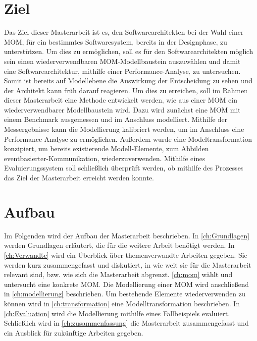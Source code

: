 \section{Ziel}
Das Ziel dieser Masterarbeit ist es, den Softwarearchitekten bei der Wahl einer MOM, für ein bestimmtes  Softwaresystem, bereits in der Designphase, zu unterstützen. Um dies zu ermöglichen, soll es für den Softwarearchitekten möglich sein einen wiederverwendbaren MOM-Modellbaustein auszuwählen und damit eine Softwarearchitektur, mithilfe einer Performance-Analyse, zu untersuchen. Somit ist bereits auf Modellebene die Auswirkung der Entscheidung zu sehen und der Architekt kann früh darauf reagieren. Um dies zu erreichen, soll im Rahmen dieser Masterarbeit eine Methode entwickelt werden, wie aus einer MOM ein wiederverwendbarer Modellbaustein wird. Dazu wird zunächst eine MOM mit einem Benchmark ausgemessen und im Anschluss modelliert. Mithilfe der Messergebnisse kann die Modellierung kalibriert werden, um im Anschluss eine Performance-Analyse zu ermöglichen. Außerdem wurde eine Modeltransformation konzipiert, um bereits existierende Modell-Elemente, zum Abbilden eventbasierter-Kommunikation, wiederzuverwenden. Mithilfe eines Evaluierungssystem soll schließlich überprüft werden, ob mithilfe des Prozesses das Ziel der Masterarbeit erreicht werden konnte.

\section{Aufbau}
Im Folgenden wird der Aufbau der Masterarbeit beschrieben. In \autoref{ch:Grundlagen} werden Grundlagen erläutert, die für die weitere Arbeit benötigt werden. In \autoref{ch:Verwandte} wird ein Überblick über themenverwandte Arbeiten gegeben. Sie werden kurz zusammengefasst und diskutiert, in
wie weit sie für die Masterarbeit relevant sind, bzw. wie sich die Masterarbeit abgrenzt. \autoref{ch:mom} wählt und untersucht eine konkrete MOM. Die Modellierung einer MOM wird anschließend in \autoref{ch:modellierung} beschrieben. Um bestehende Elemente wiederverwenden zu können wird in \autoref{ch:transformation} eine Modelltransformation beschrieben. In \autoref{ch:Evaluation} wird die Modellierung mithilfe eines Fallbeispiels evaluiert. Schließlich wird in \autoref{ch:zusammenfassung} die Masterarbeit zusammengefasst und ein Ausblick für zukünftige Arbeiten gegeben.


